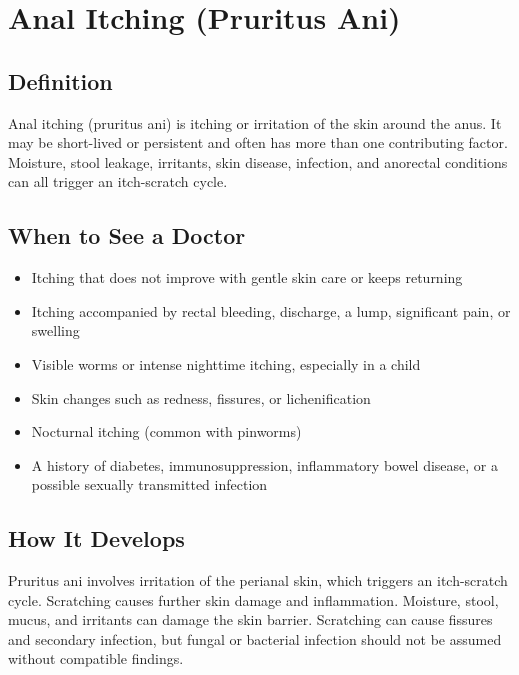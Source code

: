 \chapter{Anal Itching (Pruritus Ani)}

\section*{Definition}
Anal itching (pruritus ani) is itching or irritation of the skin around the anus. It may be short-lived or persistent and often has more than one contributing factor. Moisture, stool leakage, irritants, skin disease, infection, and anorectal conditions can all trigger an itch-scratch cycle.

\section*{When to See a Doctor}
\begin{itemize}
\item Itching that does not improve with gentle skin care or keeps returning
\item Itching accompanied by rectal bleeding, discharge, a lump, significant pain, or swelling
\item Visible worms or intense nighttime itching, especially in a child
\item Skin changes such as redness, fissures, or lichenification
\item Nocturnal itching (common with pinworms)
\item A history of diabetes, immunosuppression, inflammatory bowel disease, or a possible sexually transmitted infection
\end{itemize}

\section*{How It Develops}
Pruritus ani involves irritation of the perianal skin, which triggers an itch-scratch cycle. Scratching causes further skin damage and inflammation. Moisture, stool, mucus, and irritants can damage the skin barrier. Scratching can cause fissures and secondary infection, but fungal or bacterial infection should not be assumed without compatible findings.

